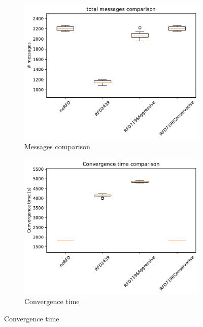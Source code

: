 \begin{figure}[h]
     \centering
     \begin{subfigure}[b]{0.49\textwidth}
         \centering
         \includegraphics[width=\textwidth]{images/RFD/clique/clique_rfd_comparison_messages_boxplot.pdf}
         \caption{Messages comparison}
         \label{fig:RFD_clique_MRAI30_messages}
     \end{subfigure}
     \hfill
     \begin{subfigure}[b]{0.49\textwidth}
         \centering
         \includegraphics[width=\textwidth]{images/RFD/clique/clique_rfd_comparison_time_boxplot.pdf}
         \caption{Convergence time}
         \label{fig:RFD_clique_MRAI30_convTime}

\end{subfigure}
\end{figure}
